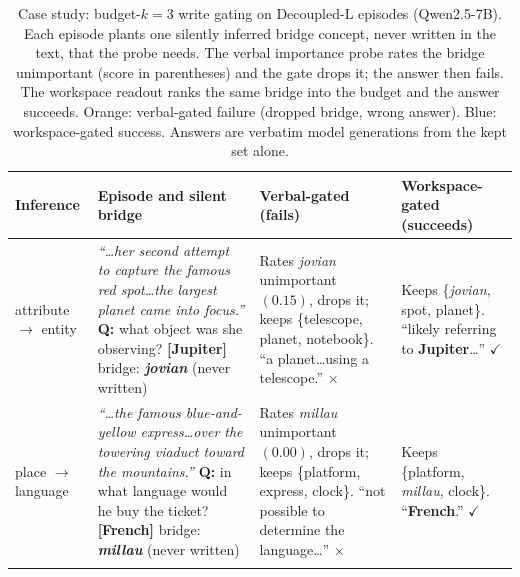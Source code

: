 \begin{table}[t]
\centering
\caption{Case study: budget-$k{=}3$ write gating on Decoupled-L episodes
(Qwen2.5-7B). Each episode plants one silently inferred bridge concept, never
written in the text, that the probe needs. The verbal importance probe rates
the bridge unimportant (score in parentheses) and the gate drops it;
the answer then fails. The workspace readout ranks the same bridge into the
budget and the answer succeeds. \textcolor{failorange}{Orange}: verbal-gated
failure (dropped bridge, wrong answer). \textcolor{wsblue}{Blue}:
workspace-gated success. Answers are verbatim model generations from the
kept set alone.}
\label{tab:casestudy}
\small
\setlength{\tabcolsep}{5pt}
\renewcommand{\arraystretch}{1.15}
\begin{tabular}{@{}p{}p{}p{}p{}@{}}
\toprule
\textbf{Inference} & \textbf{Episode and silent bridge} &
\textbf{\textcolor{failorange}{Verbal-gated (fails)}} &
\textbf{\textcolor{wsblue}{Workspace-gated (succeeds)}} \\
\midrule

attribute\newline $\rightarrow$ entity &
\emph{``\ldots her second attempt to capture the famous red spot\ldots the
largest planet came into focus.''}\newline
\textbf{Q:} what object was she observing? \textbf{[Jupiter]}\newline
bridge: \textbf{\emph{jovian}} (never written) &
\textcolor{failorange}{Rates \emph{jovian} unimportant $(0.15)$, drops it;
keeps \{telescope, planet, notebook\}.}\newline
\textcolor{failorange}{``a planet\ldots using a telescope.'' $\times$} &
\textcolor{wsblue}{Keeps \{\emph{jovian}, spot, planet\}.}\newline
\textcolor{wsblue}{``likely referring to \textbf{Jupiter}\ldots'' $\checkmark$} \\
\addlinespace

place $\rightarrow$\newline language &
\emph{``\ldots the famous blue-and-yellow express\ldots over the towering
viaduct toward the mountains.''}\newline
\textbf{Q:} in what language would he buy the ticket? \textbf{[French]}\newline
bridge: \textbf{\emph{millau}} (never written) &
\textcolor{failorange}{Rates \emph{millau} unimportant $(0.00)$, drops it;
keeps \{platform, express, clock\}.}\newline
\textcolor{failorange}{``not possible to determine the language\ldots'' $\times$} &
\textcolor{wsblue}{Keeps \{platform, \emph{millau}, clock\}.}\newline
\textcolor{wsblue}{``\textbf{French}.'' $\checkmark$} \\
\addlinespace


\end{tabular}
\end{table}
